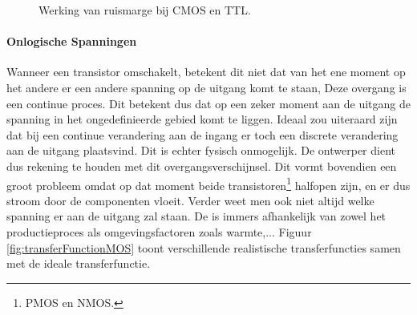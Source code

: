 \begin{figure}[hbt]
\caption{Werking van ruismarge bij CMOS en TTL.}
\label{fig:noiseMargin}
\end{figure}
\paragraph{Onlogische Spanningen}
Wanneer een transistor omschakelt, betekent dit niet dat van het ene moment op het andere er een andere spanning op de uitgang komt te staan, Deze overgang is een continue proces. Dit betekent dus dat op een zeker moment aan de uitgang de spanning in het ongedefinieerde gebied komt te liggen. Ideaal zou uiteraard zijn dat bij een continue verandering aan de ingang er toch een discrete verandering aan de uitgang plaatsvind. Dit is echter fysisch onmogelijk. De ontwerper dient dus rekening te houden met dit overgangsverschijnsel. Dit vormt bovendien een groot probleem omdat op dat moment beide transistoren\footnote{PMOS en NMOS.} halfopen zijn, en er dus stroom door de componenten vloeit. Verder weet men ook niet altijd welke spanning er aan de uitgang zal staan. De  is immers afhankelijk van zowel het productieproces als omgevingsfactoren zoals warmte,... Figuur \ref{fig:transferFunctionMOS} toont verschillende realistische transferfuncties samen met de ideale transferfunctie.
